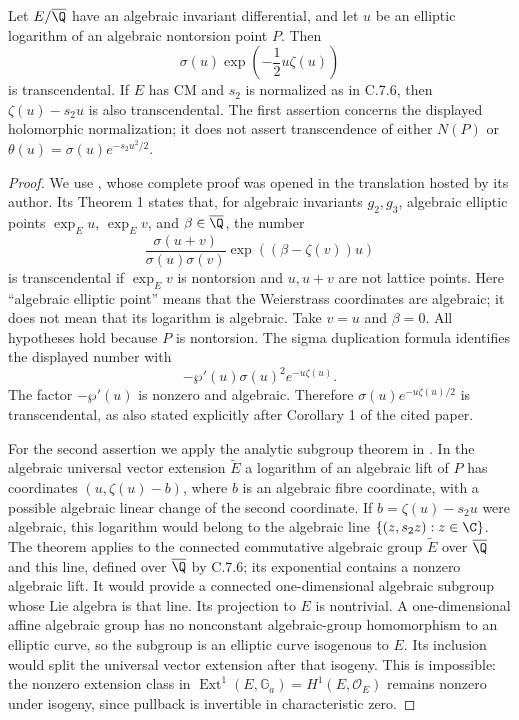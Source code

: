 \begin{statement}
Let $E/\overline{\Q}$ have an algebraic invariant differential,
and let $u$ be an elliptic logarithm of an algebraic nontorsion
point $P$. Then
\[
 \sigma(u)\exp\left(-\frac12u\zeta(u)\right)
\]
is transcendental. If $E$ has CM and $s_2$ is normalized as in
C.7.6, then $\zeta(u)-s_2u$ is also transcendental. The first
assertion concerns the displayed holomorphic normalization;
it does not assert transcendence of either $N(P)$ or
$\theta(u)=\sigma(u)e^{-s_2u^2/2}$.
\end{statement}
\begin{proof}
We use \citet[Theorem 1 and Corollary 1]{waldschmidt1979sigma},
whose complete proof was opened in the translation hosted by its
author. Its Theorem 1 states that, for algebraic invariants
$g_2,g_3$, algebraic elliptic points $\exp_Eu$, $\exp_Ev$, and
$\beta\in\overline{\Q}$, the number
\[
 \frac{\sigma(u+v)}{\sigma(u)\sigma(v)}
                      \exp((\beta-\zeta(v))u)
\]
is transcendental if $\exp_Ev$ is nontorsion and $u,u+v$
are not lattice points. Here ``algebraic elliptic point''
means that the Weierstrass coordinates are algebraic; it does
not mean that its logarithm is algebraic. Take $v=u$ and
$\beta=0$. All hypotheses hold because $P$ is nontorsion.
The sigma duplication formula identifies the displayed number
with
\[
 -\wp'(u)\sigma(u)^2e^{-u\zeta(u)}.
\]
The factor $-\wp'(u)$ is nonzero and algebraic. Therefore
$\sigma(u)e^{-u\zeta(u)/2}$ is transcendental, as also stated
explicitly after Corollary 1 of the cited paper.

For the second assertion we apply the analytic subgroup theorem
in \citet[Theorem 6.1]{huber2022}. In the algebraic universal
vector extension $\widetilde E$ a logarithm of an algebraic lift
of $P$ has coordinates $(u,\zeta(u)-b)$, where $b$ is an algebraic
fibre coordinate, with a possible algebraic linear change of the
second coordinate. If $b=\zeta(u)-s_2u$ were algebraic, this
logarithm would belong to the algebraic line
$\{(z,s_2z):z\in\C\}$. The theorem applies to the connected
commutative algebraic group $\widetilde E$ over
$\overline{\Q}$ and this line, defined over $\overline{\Q}$ by
C.7.6; its exponential contains a nonzero algebraic lift.
It would provide a connected one-dimensional algebraic subgroup
whose Lie algebra is that line. Its projection to $E$ is
nontrivial. A one-dimensional affine algebraic group has no
nonconstant algebraic-group homomorphism to an elliptic curve,
so the subgroup is an elliptic curve isogenous to $E$.
Its inclusion would split the universal vector extension after
that isogeny. This is impossible: the nonzero extension class in
$\operatorname{Ext}^1(E,\mathbb G_a)=H^1(E,\mathcal O_E)$
remains nonzero under isogeny, since pullback is invertible in
characteristic zero.
\end{proof}
